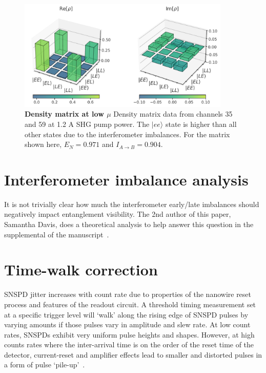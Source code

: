 \documentclass[11pt]{caltech_thesis} %
\begin{document}
\hypertarget{fig:density_matrix}{%
\begin{figure}
\centering
\includegraphics[width=0.9\textwidth,height=\textheight]{./chapter_05/figs/density_matrix_light.pdf}
\caption[{Density matrix at low \(\mu\)}]{\textbf{Density matrix at low $\mu$} Density matrix data from channels 35 and 59 at 1.2 A SHG pump power. The $|ee\rangle$ state is higher than all other states due to the interferometer imbalances. For the matrix shown here, $E_N = 0.971$ and $I_{A\rightarrow B} = 0.904$.}
\label{fig:density_matrix}
\end{figure}
}

\hypertarget{interferometer-imbalance-analysis}{%
\section{Interferometer imbalance analysis}\label{interferometer-imbalance-analysis}}

It is not trivially clear how much the interferometer early/late imbalances should negatively impact entanglement visibility. The 2nd author of this paper, Samantha Davis, does a theoretical analysis to help answer this question in the supplemental of the manuscript~\autocite{Mueller2023}.

\hypertarget{time-walk-correction}{%
\section{Time-walk correction}\label{time-walk-correction}}

SNSPD jitter increases with count rate due to properties of the nanowire reset process and features of the readout circuit. A threshold timing measurement set at a specific trigger level will `walk' along the rising edge of SNSPD pulses by varying amounts if those pulses vary in amplitude and slew rate. At low count rates, SNSPDs exhibit very uniform pulse heights and shapes. However, at high counts rates where the inter-arrival time is on the order of the reset time of the detector, current-reset and amplifier effects lead to smaller and distorted pulses in a form of pulse `pile-up'~\autocite{Mueller2023}.
\end{document}
